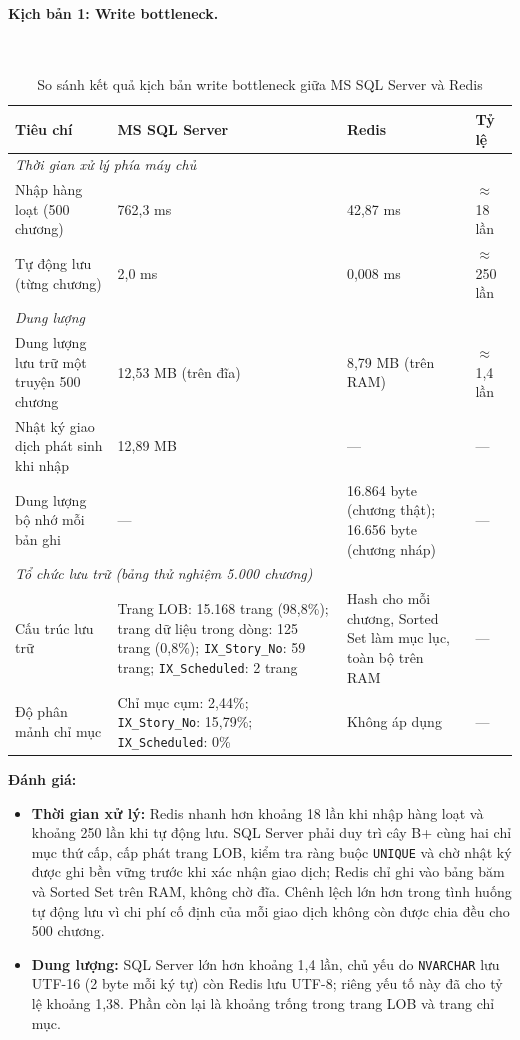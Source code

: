 \paragraph{Kịch bản 1: Write bottleneck.}\mbox{}\\
\begin{table}[H]
\centering
\small
\renewcommand{\arraystretch}{1.25}
\begin{tabular}{|p{}|p{}|p{}|p{}|}
\hline
\textbf{Tiêu chí} & \textbf{MS SQL Server} & \textbf{Redis} & \textbf{Tỷ lệ} \\ \hline
\multicolumn{4}{|l|}{\textit{Thời gian xử lý phía máy chủ}} \\ \hline
Nhập hàng loạt (500 chương) & 762,3 ms & 42,87 ms & $\approx$ 18 lần \\ \hline
Tự động lưu (từng chương) & 2,0 ms & 0,008 ms & $\approx$ 250 lần \\ \hline
\multicolumn{4}{|l|}{\textit{Dung lượng}} \\ \hline
Dung lượng lưu trữ một truyện 500 chương & 12,53 MB (trên đĩa) & 8,79 MB (trên RAM) & $\approx$ 1,4 lần \\ \hline
Nhật ký giao dịch phát sinh khi nhập & 12,89 MB & --- & --- \\ \hline
Dung lượng bộ nhớ mỗi bản ghi & --- & 16.864 byte (chương thật); 16.656 byte (chương nháp) & --- \\ \hline
\multicolumn{4}{|l|}{\textit{Tổ chức lưu trữ (bảng thử nghiệm 5.000 chương)}} \\ \hline
Cấu trúc lưu trữ & Trang LOB: 15.168 trang (98,8\%); trang dữ liệu trong dòng: 125 trang (0,8\%); \texttt{IX\_Story\_No}: 59 trang; \texttt{IX\_Scheduled}: 2 trang & Hash cho mỗi chương, Sorted Set làm mục lục, toàn bộ trên RAM & --- \\ \hline
Độ phân mảnh chỉ mục & Chỉ mục cụm: 2,44\%; \texttt{IX\_Story\_No}: 15,79\%; \texttt{IX\_Scheduled}: 0\% & Không áp dụng & --- \\ \hline
\end{tabular}
\caption{So sánh kết quả kịch bản write bottleneck giữa MS SQL Server và Redis}
\label{tab:ds-write-results}
\end{table}

\textbf{Đánh giá:}
\begin{itemize}
    \item \textbf{Thời gian xử lý:} Redis nhanh hơn khoảng 18 lần khi nhập hàng loạt và khoảng 250 lần khi tự động lưu. SQL Server phải duy trì cây B+ cùng hai chỉ mục thứ cấp, cấp phát trang LOB, kiểm tra ràng buộc \texttt{UNIQUE} và chờ nhật ký được ghi bền vững trước khi xác nhận giao dịch; Redis chỉ ghi vào bảng băm và Sorted Set trên RAM, không chờ đĩa. Chênh lệch lớn hơn trong tình huống tự động lưu vì chi phí cố định của mỗi giao dịch không còn được chia đều cho 500 chương.
    \item \textbf{Dung lượng:} SQL Server lớn hơn khoảng 1,4 lần, chủ yếu do \texttt{NVARCHAR} lưu UTF-16 (2 byte mỗi ký tự) còn Redis lưu UTF-8; riêng yếu tố này đã cho tỷ lệ khoảng 1,38. Phần còn lại là khoảng trống trong trang LOB và trang chỉ mục.
\end{itemize}

